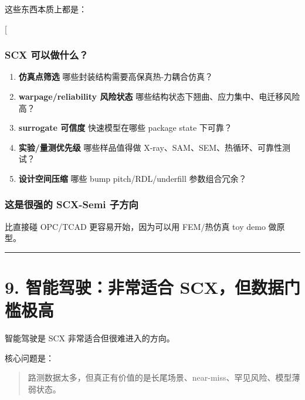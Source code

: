 \documentclass[
  12pt,
]{ctexart}
\begin{document}
这些东西本质上都是：

{[}  \rightarrow
{} \rightarrow
\text{reliability/yield}{]}

\subsubsection{SCX
可以做什么？}\label{scx-ux53efux4ee5ux505aux4ec0ux4e48-1}

\begin{enumerate}
\def\labelenumi{\arabic{enumi}.}
\item
  \textbf{仿真点筛选} 哪些封装结构需要高保真热-力耦合仿真？
\item
  \textbf{warpage/reliability 风险状态}
  哪些结构状态下翘曲、应力集中、电迁移风险高？
\item
  \textbf{surrogate 可信度} 快速模型在哪些 package state 下可靠？
\item
  \textbf{实验/量测优先级} 哪些样品值得做
  X-ray、SAM、SEM、热循环、可靠性测试？
\item
  \textbf{设计空间压缩} 哪些 bump pitch/RDL/underfill 参数组合冗余？
\end{enumerate}

\subsubsection{这是很强的 SCX-Semi
子方向}\label{ux8fd9ux662fux5f88ux5f3aux7684-scx-semi-ux5b50ux65b9ux5411}

比直接碰 OPC/TCAD 更容易开始，因为可以用 FEM/热仿真 toy demo 做原型。

\begin{center}\rule{0.5\linewidth}{0.5pt}\end{center}

\section{9. 智能驾驶：非常适合
SCX，但数据门槛极高}\label{ux667aux80fdux9a7eux9a76ux975eux5e38ux9002ux5408-scxux4f46ux6570ux636eux95e8ux69dbux6781ux9ad8}

智能驾驶是 SCX 非常适合但很难进入的方向。

核心问题是：

\begin{quote}
路测数据太多，但真正有价值的是长尾场景、near-miss、罕见风险、模型薄弱状态。
\end{quote}
\end{document}
